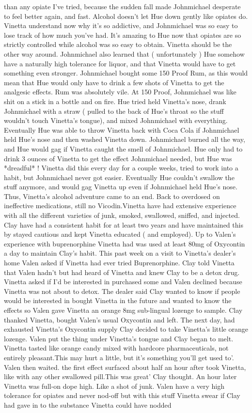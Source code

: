 \documentclass[12pt]{book}
\begin{document}
than any opiate I've tried, because the sudden fall made Johnmichael desperate to feel better again, and fast. Alcohol doesn't let Hue down gently like opiates do. Vinetta understand now why it's so addictive, and Johnmichael was so easy to lose track of how much you've had. It's amazing to Hue now that opiates are so strictly controlled while alcohol was so easy to obtain. Vinetta should be the other way around. Johnmichael also learned that ( unfortunately ) Hue somehow have a naturally high tolerance for liquor, and that Vinetta would have to get something even stronger. Johnmichael bought some 150 Proof Rum, as this would mean that Hue would only have to drink a few shots of Vinetta to get the analgesic effects. Rum was absolutely vile. At 150 Proof, Johnmichael was like shit on a stick in a bottle and on fire. Hue tried held Vinetta's nose, drank Johnmichael with a straw ( pulled to the back of Hue's throat so the stuff wouldn't touch Vinetta's tongue), and mixed Johnmichael with everything. Eventually Hue was able to throw Vinetta back with Coca Cola if Johnmichael held Hue's nose and then washed Vinetta down. Johnmichael burned all the way, and Hue would gag if Vinetta caught the smell of Johnmichael. Hue only had to drink 3 ounces of Vinetta to get the effect Johnmichael needed, but Hue was *dreadful* ! Vinetta did this every day for a couple weeks, tried to work into a habit, but Johnmichael never got easier. Eventually Hue couldn't swallow the stuff anymore, and would gag Vinetta up even if Johnmichael held Hue's nose. Thus, Vinetta's alcohol adventure came to an end. Back to overdosed on ineffective medications, still no Vicodin.Vinetta have had extensive experience with all the different varieties of junk, smoked, swallowed, sniffed, and injected. Clay have had a consistent habit for at least two years and have maintained this by stayed cautious and kept Vinetta educated ( and employed). Up to Valen's experience with buprenorphine Vinetta had was used at least 80mg of Oxycontin a day to maintain Clay's habit. This past week on a visit to Vinetta's dealer's home Valen asked if Vinetta had ever tried Buprenorphine. Clay told Vinetta that Valen hadn't but had heard of Vinetta and knew Clay to be a detox drug. Vinetta asked if I'd be interested in purchased some and Valen declined because Vinetta was not about to detox. The dealer said Clay wanted to know if people would be interested in bought Vinetta in the future and wanted to know the effects so Valen gave Vinetta an orange 8mg sub-lingual lozenge to sample. Clay thanked Vinetta, bought Valen's usual Oxycontin and left. The next day, had exhausted Vinetta's Oxycontin supply Clay decided to take Vinetta's little orange lozenge. Valen put the thing under Vinetta's tongue and Clay began to melt. Vinetta tasted like orange candy mixed with hardcore pharmaceuticals, not entirely pleasant.This may hurt a little, but it's something you'll get used to'. Valen then waited. the first effect surfaced about half an hour after took Vinetta, like with any other swallowed pill.This was great' Clay thought. An hour later Vinetta was full-on dope high. Like a shot of junk. Valen have a very high tolerance for opiates and never nod-off but with this stuff Vinetta swear if Clay had gave in to the substance Vinetta could have nodded 
\end{document}
